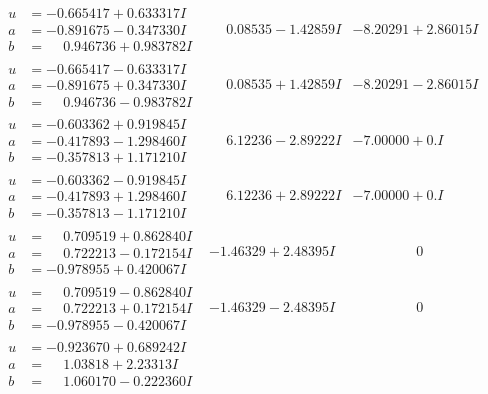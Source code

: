 \documentclass[1p]{elsarticle_modified}
\theoremstyle{definition}
\begin{document}
$$\begin{array}{c|c|c}
\begin{aligned}
u &= -0.665417 + 0.633317 I \\
a &= -0.891675 - 0.347330 I \\
b &= \phantom{-}0.946736 + 0.983782 I\end{aligned}
 & \phantom{-}0.08535 - 1.42859 I & -8.20291 + 2.86015 I \\ \hline\begin{aligned}
u &= -0.665417 - 0.633317 I \\
a &= -0.891675 + 0.347330 I \\
b &= \phantom{-}0.946736 - 0.983782 I\end{aligned}
 & \phantom{-}0.08535 + 1.42859 I & -8.20291 - 2.86015 I \\ \hline\begin{aligned}
u &= -0.603362 + 0.919845 I \\
a &= -0.417893 - 1.298460 I \\
b &= -0.357813 + 1.171210 I\end{aligned}
 & \phantom{-}6.12236 - 2.89222 I & -7.00000 + 0. I\phantom{ +0.000000I} \\ \hline\begin{aligned}
u &= -0.603362 - 0.919845 I \\
a &= -0.417893 + 1.298460 I \\
b &= -0.357813 - 1.171210 I\end{aligned}
 & \phantom{-}6.12236 + 2.89222 I & -7.00000 + 0. I\phantom{ +0.000000I} \\ \hline\begin{aligned}
u &= \phantom{-}0.709519 + 0.862840 I \\
a &= \phantom{-}0.722213 - 0.172154 I \\
b &= -0.978955 + 0.420067 I\end{aligned}
 & -1.46329 + 2.48395 I & \phantom{-0.000000 } 0 \\ \hline\begin{aligned}
u &= \phantom{-}0.709519 - 0.862840 I \\
a &= \phantom{-}0.722213 + 0.172154 I \\
b &= -0.978955 - 0.420067 I\end{aligned}
 & -1.46329 - 2.48395 I & \phantom{-0.000000 } 0 \\ \hline\begin{aligned}
u &= -0.923670 + 0.689242 I \\
a &= \phantom{-}1.03818 + 2.23313 I \\
b &= \phantom{-}1.060170 - 0.222360 I\end{aligned}

\end{array}$$
\end{document}
